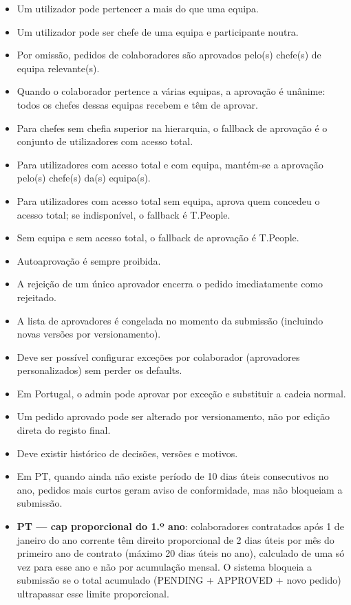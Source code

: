 \documentclass[11pt,a4paper]{article}
\begin{document}
\begin{itemize}
  \item Um utilizador pode pertencer a mais do que uma equipa.
  \item Um utilizador pode ser chefe de uma equipa e participante noutra.
  \item Por omissão, pedidos de colaboradores são aprovados pelo(s) chefe(s) de equipa relevante(s).
  \item Quando o colaborador pertence a várias equipas, a aprovação é unânime: todos os chefes dessas equipas recebem e têm de aprovar.
  \item Para chefes sem chefia superior na hierarquia, o fallback de aprovação é o conjunto de utilizadores com acesso total.
  \item Para utilizadores com acesso total e com equipa, mantém-se a aprovação pelo(s) chefe(s) da(s) equipa(s).
  \item Para utilizadores com acesso total sem equipa, aprova quem concedeu o acesso total; se indisponível, o fallback é T.People.
  \item Sem equipa e sem acesso total, o fallback de aprovação é T.People.
  \item Autoaprovação é sempre proibida.
  \item A rejeição de um único aprovador encerra o pedido imediatamente como rejeitado.
  \item A lista de aprovadores é congelada no momento da submissão (incluindo novas versões por versionamento).
  \item Deve ser possível configurar exceções por colaborador (aprovadores personalizados) sem perder os defaults.
  \item Em Portugal, o admin pode aprovar por exceção e substituir a cadeia normal.
  \item Um pedido aprovado pode ser alterado por versionamento, não por edição direta do registo final.
  \item Deve existir histórico de decisões, versões e motivos.
  \item Em PT, quando ainda não existe período de 10 dias úteis consecutivos no ano, pedidos mais curtos geram aviso de conformidade, mas não bloqueiam a submissão.
  \item \textbf{PT — cap proporcional do 1.º ano}: colaboradores contratados após 1 de janeiro do ano corrente têm direito proporcional de 2 dias úteis por mês do primeiro ano de contrato (máximo 20 dias úteis no ano), calculado de uma só vez para esse ano e não por acumulação mensal. O sistema bloqueia a submissão se o total acumulado (PENDING + APPROVED + novo pedido) ultrapassar esse limite proporcional.

\end{itemize}
\end{document}
